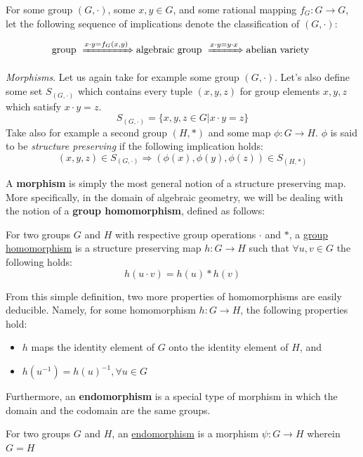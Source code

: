 For some group $(G,\cdot)$, some $x,y \in G$, and some rational mapping $f_G: G \rightarrow G$, let the following sequence of implications denote the classification of $(G,\cdot)$:

$$
\text{group } \xRightarrow[]{x\cdot y = f_G(x,y)} \text{algebraic group } \xRightarrow[]{x\cdot y = y\cdot x} \text{abelian variety }
$$


\noindent
\emph{Morphisms}. Let us again take for example some group $(G,\cdot)$. Let's also define some set $S_{(G,\cdot)}$ which contains every tuple $(x,y,z)$ for group elements $x,y,z$ which satisfy $x\cdot y = z$.
$$
S_{(G,\cdot)} = \{x,y,z \in G | x\cdot y = z\}
$$
Take also for example a second group $(H,*)$ and some map $\phi: G \rightarrow H$. $\phi$ is said to be \emph{structure preserving} if the following implication holds:
$$
(x,y,z) \in S_{(G,\cdot)} \Rightarrow (\phi(x),\phi(y),\phi(z)) \in S_{(H,*)}
$$

A \textbf{morphism} is simply the most general notion of a structure preserving map. More specifically, in the domain of algebraic geometry, we will be dealing with the notion of a \textbf{group homomorphism}, defined as follows:
\begin{tcolorbox}
\begin{definition}
\label{defn:homomorphism}
For two groups $G$ and $H$ with respective group operations $\cdot$ and $*$, a \underline{group homomorphism} is a structure preserving map $h: G \rightarrow H$ such that $\forall u, v \in G$ the following holds:
$$h(u \cdot v) = h(u) * h(v)$$
\end{definition}
\end{tcolorbox}

From this simple definition, two more properties of homomorphisms are easily deducible. Namely, for some homomorphism $h: G \rightarrow H$, the following properties hold:
\begin{itemize}
\item $h$ maps the identity element of $G$ onto the identity element of $H$, and
\item $h(u^{-1}) = h(u)^{-1}, \forall u \in G$
\end{itemize}

Furthermore, an \textbf{endomorphism} is a special type of morphism in which the domain and the codomain are the same groups.
\begin{tcolorbox}
\begin{definition}[Endomorphism]
\label{defn:endomorphism}
For two groups $G$ and $H$, an \underline{endomorphism} is a morphism $\psi: G \rightarrow H$ wherein $G = H$
\end{definition}
\end{tcolorbox}

